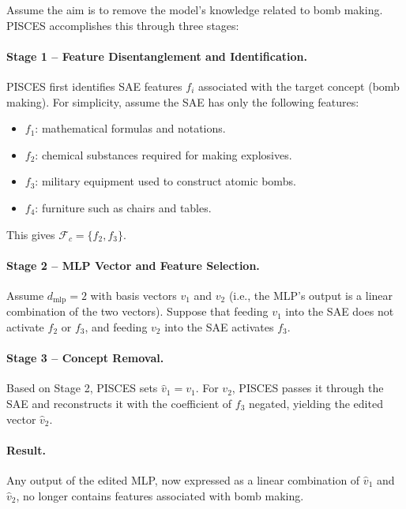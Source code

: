 \begin{examplebox}
Assume the aim is to remove the model's knowledge related to bomb making. PISCES accomplishes this through three stages:\\

\paragraph{Stage 1 -- Feature Disentanglement and Identification.} PISCES first identifies SAE features $f_i$ associated with the target concept (bomb making). For simplicity, assume the SAE has only the following features:
\begin{itemize}
    \item $f_1$: mathematical formulas and notations.
    \item $f_2$: chemical substances required for making explosives.
    \item $f_3$: military equipment used to construct atomic bombs.
    \item $f_4$: furniture such as chairs and tables.
\end{itemize}
This gives $\mathcal{F}_c=\{f_2, f_3\}$.\\

\paragraph{Stage 2 -- MLP Vector and Feature Selection.} Assume $d_{\text{mlp}}=2$ with basis vectors $v_1$ and $v_2$ (i.e., the MLP's output is a linear combination of the two vectors). Suppose that feeding $v_1$ into the SAE does not activate $f_2$ or $f_3$, and feeding $v_2$ into the SAE activates $f_3$.\\

\paragraph{Stage 3 -- Concept Removal.} Based on Stage 2, PISCES sets $\hat{v}_1=v_1$. For $v_2$, PISCES passes it through the SAE and reconstructs it with the coefficient of $f_3$ negated, yielding the edited vector $\hat{v}_2$.\\

\paragraph{Result.} Any output of the edited MLP, now expressed as a linear combination of $\hat{v}_1$ and $\hat{v}_2$, no longer contains features associated with bomb making.

\end{examplebox}

